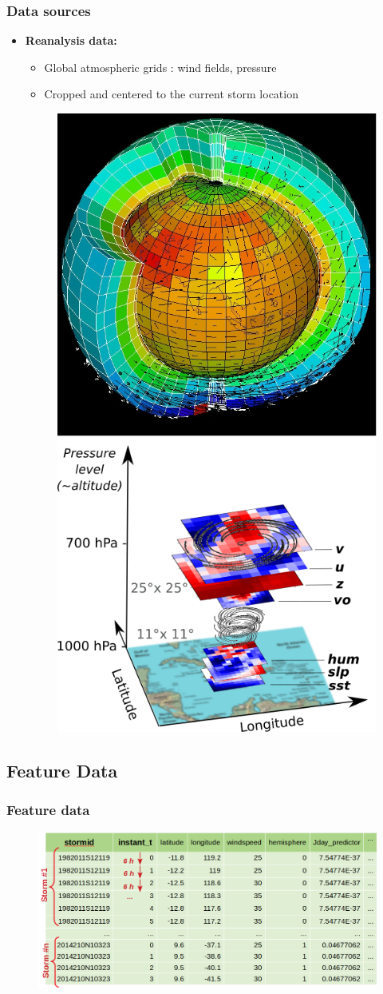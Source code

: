 \documentclass[handout]{beamer}
\begin{document}
\begin{frame}
\frametitle{Data sources}
\begin{itemize}
	\item \textbf{Reanalysis data:} 
	\begin{itemize}
		\item Global atmospheric grids : wind fields, pressure
		\item Cropped and centered to the current storm location
	\end{itemize}
	\begin{figure}
	\centering
		\includegraphics[width=0.33\linewidth]{fig/L1/reanalysis_grid.jpg}
		\hfill
		\includegraphics[width=0.46\linewidth]{fig/L1/hurricane_pb.png}
	\end{figure}
\end{itemize}
\end{frame}

\subsection{Feature Data}

\begin{frame}
\frametitle{Feature data}
	\begin{figure}
	\centering
		\includegraphics[width=0.9\linewidth]{fig/L1/feature_data.png}

	\end{figure}

\end{frame}
\end{document}
